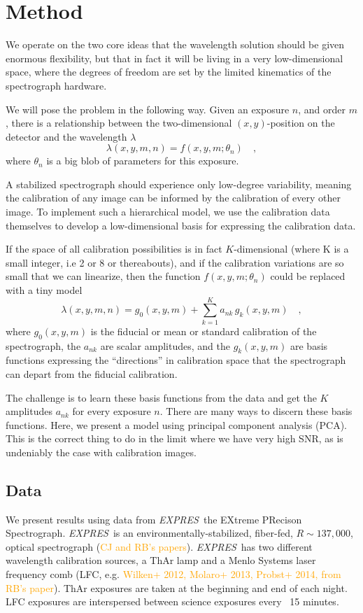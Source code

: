 \documentclass[12pt, letterpaper]{article}
\newcommand{\lz}[1]{\textcolor{orange}{#1}}
\newcommand{\project}[1]{\textsl{#1}}
\newcommand{\acronym}[1]{{\small{#1}}}
\newcommand{\expres}{\project{\acronym{EXPRES}}}
\begin{document}
\section{Method} \label{sec:method}
We operate on the two core ideas that the wavelength solution should be given enormous flexibility, but that in fact it will be living in a very low-dimensional space, where the degrees of freedom are set by the limited kinematics of the spectrograph hardware.

We will pose the problem in the following way.  Given an exposure $n$, and order $m$, there is a relationship between
the two-dimensional $(x,y)$-position on the detector and the
wavelength $\lambda$
\begin{equation}
\lambda(x,y,m,n) = f(x,y,m;\theta_{n})
\quad ,
\end{equation}
where $\theta_{n}$ is a big blob of parameters for this exposure.

A stabilized spectrograph should experience only low-degree variability, meaning the calibration of any image can be informed by the calibration of every other image.  To implement such a hierarchical model, we use the calibration data themselves to develop a low-dimensional basis for expressing the calibration data.

If the space of all calibration possibilities is in fact $K$-dimensional (where K is a small integer, i.e 2 or 8 or thereabouts), and if the calibration variations are so small that we can linearize, then the function $f(x,y,m;\theta_{n})$ could be replaced with a tiny model
\begin{equation}
\lambda(x,y,m,n) = g_0(x,y,m) + \sum_{k=1}^K a_{nk}\,g_k(x,y,m)
\quad ,
\end{equation}
where
$g_0(x,y,m)$ is the fiducial or mean or standard calibration of the spectrograph,
the $a_{nk}$ are scalar amplitudes,
and the $g_k(x,y,m)$ are basis functions expressing the ``directions'' in calibration space that the spectrograph can depart from the fiducial calibration.

The challenge is to learn these basis functions from the data and get the $K$ amplitudes $a_{nk}$ for every exposure $n$.  There are many ways to discern these basis functions.  Here, we present a model using principal component analysis (PCA).  This is the correct thing to do in the limit where we have very high SNR, as is undeniably the case with calibration images.

\subsection{Data} \label{sec:data}
We present results using data from \expres\, the EXtreme PRecison Spectrograph.  \expres\ is an environmentally-stabilized, fiber-fed, $R\sim137,000$, optical spectrograph (\lz{CJ and RB's papers}).  \expres\ has two different wavelength calibration sources, a ThAr lamp and a Menlo Systems laser frequency comb (LFC, e.g. \lz{Wilken+ 2012, Molaro+ 2013, Probst+ 2014, from RB's paper}).  ThAr exposures are taken at the beginning and end of each night.  LFC exposures are interspersed between science exposures every ~15 minutes.
\end{document}
